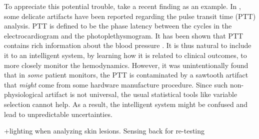 \documentclass[9pt,twocolumn,twoside]{pnas-new}
\begin{document}
{


To appreciate this potential trouble, take a recent finding as an example. In \cite{lin2019unexpected}, some delicate artifacts
  have been reported regarding the pulse
  transit time (PTT) analysis. PTT is defined to be the phase latency between the cycles in the electrocardiogram and the photoplethysmogram. It has been shown that PTT contains rich information about the blood pressure \cite{gesche2012continuous}. It is thus natural to include it to an intelligent system, by learning how it is related to clinical outcomes, to more closely monitor the hemodynamics. However, it was unintentionally found that in {\em some} patient monitors, the PTT is contaminated by a sawtooth artifact that {\em might} come from some hardware manufacture procedure.  Since such non-physiological artifact is not universal, the usual statistical tools like variable selection cannot help. As a result, the intelligent system might be confused and lead to unpredictable uncertainties. 
  
    
    
    +lighting when analyzing skin lesions. Sensing back for re-testing
    }
\end{document}
